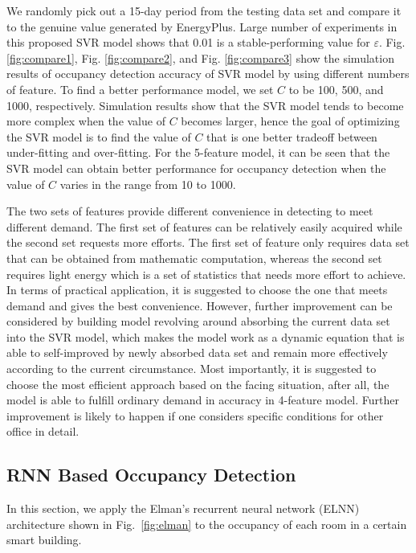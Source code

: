 We randomly pick out a 15-day period from the testing data set and compare it to the genuine value generated by EnergyPlus. Large number of experiments in this proposed SVR model shows that 0.01 is a stable-performing value for $\varepsilon$. Fig. \ref{fig:compare1}, Fig. \ref{fig:compare2}, and Fig. \ref{fig:compare3} show the simulation results of occupancy detection accuracy of SVR model by using different numbers of feature. To find a better performance model, we set $C$ to be 100, 500, and 1000, respectively. Simulation results show that the SVR model tends to become more complex when the value of $C$ becomes larger, hence the goal of optimizing the SVR model is to find the value of $C$ that is one better tradeoff between under-fitting and over-fitting. For the 5-feature model, it can be seen that the SVR model can obtain better performance for occupancy detection when the value of $C$ varies in the range from 10 to 1000.

The two sets of features provide different convenience in detecting to meet different demand. The first set of features  can be relatively easily acquired while the second set requests more efforts. The first set of feature only requires data set that can be obtained from mathematic computation, whereas the second set  requires light energy which is a set of statistics that needs more effort to achieve. In terms of practical application, it is suggested to choose the one that meets demand and gives the best convenience. However, further improvement can be considered by building model revolving around absorbing the current data set into the SVR model, which makes the model work as a dynamic equation that is able to self-improved by newly absorbed data set and remain more effectively according to the current circumstance. Most importantly, it is suggested to choose the most efficient approach based on the facing situation, after all, the model is able to fulfill ordinary demand in accuracy in 4-feature model. Further improvement is likely to happen if one considers specific conditions for other office in detail.

\subsection{RNN Based Occupancy Detection}
\label{sec:rnn-method}

In this section, we apply the Elman's recurrent neural network (ELNN) architecture shown in
Fig.~\ref{fig:elman} to the occupancy of each room in a certain smart building.

